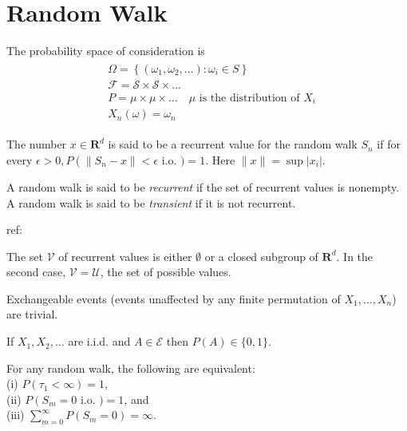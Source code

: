
\section{Random Walk}

The probability space of consideration is
\begin{align}
\begin{aligned}
&\Omega=\left\{\left(\omega_1, \omega_2, \ldots\right): \omega_i \in S\right\} \\
&\mathcal{F}=\mathcal{S} \times \mathcal{S} \times \ldots \quad \\
&P=\mu \times \mu \times \ldots \quad \mu \text { is the distribution of } X_i \\
&X_n(\omega)=\omega_n
\end{aligned}
\end{align}

\begin{definition}[Recurrence]
	The number $x \in \mathbf{R}^d$ is said to be a recurrent value for the random walk $S_n$ if for every $\epsilon>0, P\left(\left\|S_n-x\right\|<\epsilon\right.$ i.o. $)=1 .$ Here $\|x\|=\sup \left|x_i\right|$.

	A random walk is said to be \textit{recurrent} if the set of recurrent values is nonempty. A random walk is said to be \textit{transient} if it is not recurrent.

	ref: \cite{durettProbabilityTheory}
\end{definition}

\begin{theorem}
	The set $\mathcal{V}$ of recurrent values is either $\emptyset$ or a closed subgroup of $\mathbf{R}^d$. In the second case, $\mathcal{V}=\mathcal{U}$, the set of possible values.
\end{theorem}


\begin{theorem}
	Exchangeable events (events unaffected by any finite permutation of $X_1, \ldots, X_n$) are trivial.

	If $X_1, X_2, \ldots$ are i.i.d. and $A \in \mathcal{E}$ then $P(A) \in\{0,1\}$.
\end{theorem}

\begin{theorem}
	For any random walk, the following are equivalent: \\
(i) $P\left(\tau_1<\infty\right)=1$,\\ (ii) $P\left(S_m=0\right.$ i.o. $)=1$, and\\(iii) $\sum_{m=0}^{\infty} P\left(S_m=0\right)=\infty$.
\end{theorem}


